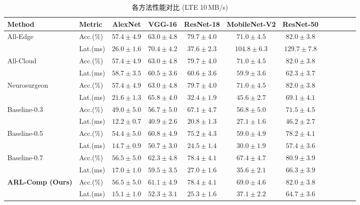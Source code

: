 \begin{table}[htbp]
\centering
\caption{各方法性能对比 (LTE 10\,MB/s)}
\label{tab:main_results}
\small
\begin{tabular}{llcccccccccc}
\toprule
\textbf{Method} & \textbf{Metric} & \textbf{AlexNet} & \textbf{VGG-16} & \textbf{ResNet-18} & \textbf{MobileNet-V2} & \textbf{ResNet-50} \\
\midrule
All-Edge & Acc.(\%) & $57.4\pm4.9$ & $63.0\pm4.8$ & $79.7\pm4.0$ & $71.0\pm4.5$ & $82.0\pm3.8$ \\
& Lat.(ms) & $26.0\pm1.6$ & $70.4\pm4.2$ & $37.6\pm2.3$ & $104.8\pm6.3$ & $129.7\pm7.8$ \\
\midrule
All-Cloud & Acc.(\%) & $57.4\pm4.9$ & $63.0\pm4.8$ & $79.7\pm4.0$ & $71.0\pm4.5$ & $82.0\pm3.8$ \\
& Lat.(ms) & $58.7\pm3.5$ & $60.5\pm3.6$ & $60.6\pm3.6$ & $59.9\pm3.6$ & $62.3\pm3.7$ \\
\midrule
Neurosurgeon & Acc.(\%) & $57.4\pm4.9$ & $63.0\pm4.8$ & $79.7\pm4.0$ & $71.0\pm4.5$ & $82.0\pm3.8$ \\
& Lat.(ms) & $21.6\pm1.3$ & $65.8\pm4.0$ & $32.4\pm1.9$ & $45.6\pm2.7$ & $69.1\pm4.1$ \\
\midrule
Baseline-0.3 & Acc.(\%) & $49.0\pm5.0$ & $56.7\pm5.0$ & $67.1\pm4.7$ & $56.8\pm5.0$ & $71.5\pm4.5$ \\
& Lat.(ms) & $12.2\pm0.7$ & $40.9\pm2.6$ & $20.8\pm1.3$ & $27.1\pm1.6$ & $46.2\pm2.7$ \\
\midrule
Baseline-0.5 & Acc.(\%) & $54.4\pm5.0$ & $60.8\pm4.9$ & $75.2\pm4.3$ & $59.0\pm4.9$ & $78.2\pm4.1$ \\
& Lat.(ms) & $14.7\pm0.9$ & $50.7\pm3.0$ & $24.5\pm1.4$ & $30.0\pm1.9$ & $57.4\pm3.6$ \\
\midrule
Baseline-0.7 & Acc.(\%) & $56.5\pm5.0$ & $62.3\pm4.8$ & $78.4\pm4.1$ & $67.4\pm4.7$ & $80.9\pm3.9$ \\
& Lat.(ms) & $17.0\pm1.0$ & $59.5\pm3.5$ & $27.0\pm1.6$ & $35.6\pm2.1$ & $66.3\pm3.9$ \\
\midrule
\textbf{ARL-Comp (Ours)} & Acc.(\%) & $\mathbf{56.5\pm5.0}$ & $\mathbf{61.1\pm4.9}$ & $\mathbf{78.4\pm4.1}$ & $\mathbf{69.0\pm4.6}$ & $\mathbf{82.0\pm3.8}$ \\
& Lat.(ms) & $\mathbf{15.1\pm1.0}$ & $\mathbf{52.3\pm3.1}$ & $\mathbf{25.3\pm1.6}$ & $\mathbf{37.1\pm2.2}$ & $\mathbf{64.7\pm3.6}$ \\
\bottomrule
\end{tabular}
\end{table}